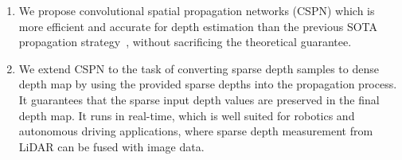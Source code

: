 \begin{enumerate}
    \item We propose convolutional spatial propagation networks (CSPN) which is more efficient and accurate for depth estimation than the previous SOTA propagation strategy~\cite{liu2017learning}, without sacrificing the theoretical guarantee.
    
    \item  We extend CSPN to the task of converting sparse depth samples to dense depth map by using the provided sparse depths into the propagation process. It guarantees that the sparse input depth values are preserved in the final depth map.  
    It runs in real-time, which is well suited for robotics and autonomous driving applications, where sparse depth measurement from LiDAR can be fused with image data.
    
\end{enumerate}
